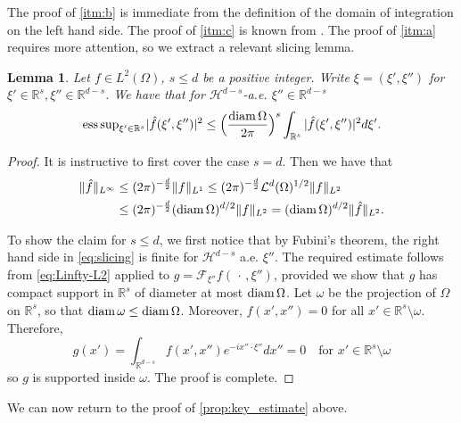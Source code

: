 \documentclass[a4paper, 10pt, twoside, notitlepage]{amsart}
\theoremstyle{plain}
\newtheorem{lem}[prop]{Lemma}
\newcommand{\R}{\mathbb{R}}
\newcommand{\diam}{\textup{diam}}
\begin{document}
		The proof of \ref{itm:b} is immediate from the definition of the domain of integration on the left hand side. The proof of \ref{itm:c} is known from \cite{KKO13}. The proof of
		\ref{itm:a} requires more attention, so we extract a relevant slicing lemma.
		\begin{lem}\label{lem:slicing}
			Let $f\in L^2(\Omega)$, $s\leq d$ be a positive integer. Write $\xi=(\xi',\xi'')$ for $\xi'\in\R^s, \xi'' \in \R^{d-s}$. We have that for $\mathcal H^{d-s}$-a.e. $\xi''\in\R^{d-s}$
			\begin{align} \label{eq:slicing}
                          {\mathrm{ess\,sup}_{\xi'\in\R^s}}|\hat f(\xi',\xi'')|^2\leq \Big(\frac{\diam\,\Omega}{2\pi}\Big)^{s}\int_{\R^s}|\hat f(\xi',\xi'')|^2 d\xi'.
			\end{align}
		\end{lem}
		\begin{proof}
			It is instructive to first cover the case $s=d$. Then we have that
			\begin{align}\label{eq:Linfty-L2}
                          \begin{split}
				\|\hat f\|_{L^\infty} &\leq (2\pi)^{-\frac{d}{2}}\|f\|_{L^1} \leq (2\pi)^{-\frac{d}{2}} \mathcal L^d( \Omega)^{1/2}\|f\|_{L^2} \\
                                                      & \leq (2\pi)^{-\frac{d}{2}} (\diam \,\Omega)^{d/2}\|f\|_{L^2} = (\diam \,\Omega)^{d/2}\|\hat f\|_{L^2}.
                                                        \end{split}
			\end{align}
			
			To show the claim for $s \leq d$, we first notice that by Fubini's theorem, the right hand side in \eqref{eq:slicing} is finite for $\mathcal H^{d-s}$ a.e. $\xi''$. The required estimate follows from
			\eqref{eq:Linfty-L2} applied to $g=\mathcal F_{\xi''}f(\,\cdot\,,\xi'')$, provided we show that $g$ has compact support in $\R^s$ of diameter at most $\diam\, \Omega$. Let $\omega$ be the
			projection of $\Omega$ on $\R^s$, so that $\diam\,\omega\leq \diam\,\Omega$. Moreover, $f(x',x'')=0$ for all $x'\in\R^s\setminus\omega$. Therefore,
			$$
			g(x')=\int_{\R^{d-s}}f(x',x'')e^{-ix''\cdot\xi''}dx''=0\quad \text{for } x'\in\R^s\setminus\omega
			$$
			so $g$ is supported inside $\omega$. The proof is complete.
		\end{proof}
		We can now return to the proof of \cref{prop:key_estimate} above.
\end{document}
